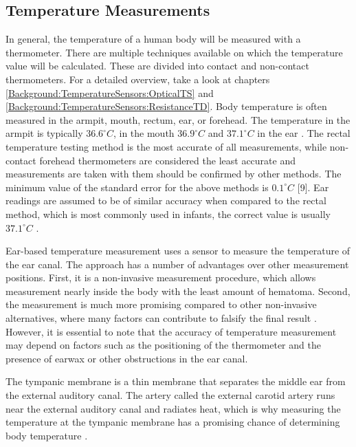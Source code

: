 \subsection{Temperature Measurements}
\label{Background:BodyTemperature:TemperatureMeasurements}
In general, the temperature of a human body will be measured with a thermometer.
There are multiple techniques available on which the temperature value will be calculated. 
These are divided into contact and non-contact thermometers.
For a detailed overview, take a look at chapters \ref{Background:TemperatureSensors:OpticalTS} and \ref{Background:TemperatureSensors:ResistanceTD}.
Body temperature is often measured in the armpit, mouth, rectum, ear, or forehead.
The temperature in the armpit is typically $36.6^\circ C$, in the mouth $36.9^\circ C$ and $37.1^\circ C$ in the ear \cite{dolibogComparativeAnalysisHuman2022}.
The rectal temperature testing method is the most accurate of all measurements, while non-contact forehead thermometers are considered the least accurate and measurements are taken with them should be confirmed by other methods.
The minimum value of the standard error for the above methods is $0.1^\circ C$ [9].
Ear readings are assumed to be of similar accuracy when compared to the rectal method, which is most commonly used in infants, the correct value is usually $37.1^\circ C$ \cite{dolibogComparativeAnalysisHuman2022}.

Ear-based temperature measurement uses a sensor to measure the temperature of the ear canal. 
The approach has a number of advantages over other measurement positions.
First, it is a non-invasive measurement procedure, which allows measurement nearly inside the body with the least amount of hematoma.
Second, the measurement is much more promising compared to other non-invasive alternatives, where many factors can contribute to falsify the final result \cite{ganioValidityReliabilityDevices2009, craigTemperatureMeasuredAxilla2000}. 
However, it is essential to note that the accuracy of temperature measurement may depend on factors such as the positioning of the thermometer and the presence of earwax or other obstructions in the ear canal.

The tympanic membrane is a thin membrane that separates the middle ear from the external auditory canal. 
The artery called the external carotid artery runs near the external auditory canal and radiates heat, which is why measuring the temperature at the tympanic membrane has a promising chance of determining body temperature \cite{yeohRevisitingTympanicMembrane2017}.

